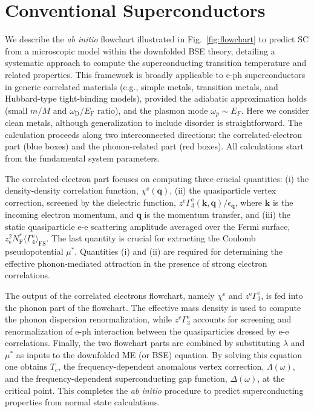 \documentclass[%
 reprint,
superscriptaddress,
 amsmath,amssymb,
 aps,
prx,
]{revtex4-2}
\newcommand{\comment}[1]{\textcolor{teal}{#1}}
\newcommand{\bq}{\mathbf{q}}
\newcommand{\bk}{\mathbf{k}}
\newcommand{\txc}{\text{c}}
\newcommand{\txe}{\text{e}}
\newcommand{\txD}{\text{D}}
\newcommand{\txF}{\text{F}}
\newcommand{\txFS}{\text{FS}}
\begin{document}
\section{Conventional Superconductors}
\label{sec:realmaterial}

We describe the \textit{ab initio} flowchart illustrated in Fig.~\ref{fig:flowchart} to predict SC from a microscopic model within the downfolded BSE theory, detailing a systematic approach to compute the superconducting transition temperature and related properties. This framework is broadly applicable to e-ph superconductors in generic correlated materials (e.g., simple metals, transition metals, and Hubbard-type tight-binding models), provided the adiabatic approximation holds (small $m/M$ and $\omega_\txD/E_\txF$ ratio), and the plasmon mode $\omega_p \sim E_F$. Here we consider clean metals, although generalization to include disorder is straightforward. The calculation proceeds along two interconnected directions: the correlated-electron part (blue boxes) and the phonon-related part (red boxes). All calculations start from the fundamental system parameters.

The correlated-electron part focuses on computing three crucial quantities:
(i) the density-density correlation function, $\chi^\txe(\bq)$,
(ii) the quasiparticle vertex correction, screened by the dielectric function, $z^\txe \Gamma_3^\txe(\bk, \bq)/\epsilon_\bq$, where $\bk$ is the incoming electron momentum, and $\bq$ is the momentum transfer, and (iii) the static quasiparticle e-e scattering amplitude averaged over the Fermi surface, $z_\txe^2 N_\txF^* \langle \Gamma^\txe_4 \rangle_\txFS$.
The last quantity is crucial for extracting the Coulomb pseudopotential $\mu^*$. Quantities (i) and (ii) are required for determining the effective phonon-mediated attraction in the presence of strong electron correlations.

The output of the correlated electrons flowchart, namely $\chi^\txe$ and $z^\txe \Gamma_3^\txe$, is fed into the phonon part of the flowchart. The effective mass density is used to compute the phonon dispersion renormalization, while $z^\txe \Gamma_3^\txe$ accounts for screening and renormalization of e-ph interaction between the quasiparticles dressed by e-e correlations. Finally, the two flowchart parts are combined by substituting $\lambda$ and $\mu^*$ as inputs to the downfolded ME (or BSE) equation. By solving this equation one obtains $T_\txc$, the frequency-dependent anomalous vertex correction, $\Lambda(\omega)$, and the frequency-dependent superconducting gap function, $\Delta(\omega)$, at the critical point. This completes the \textit{ab initio} procedure to predict superconducting properties from normal state calculations.
\end{document}
